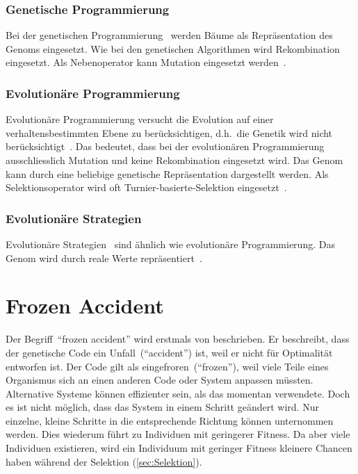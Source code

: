       \subsubsection{Genetische Programmierung\label{item:genProg}}

        Bei der genetischen Programmierung~\cite{book:genProg} werden Bäume als Repräsentation des Genoms eingesetzt.
        Wie bei den genetischen Algorithmen wird Rekombination eingesetzt.
        Als Nebenoperator kann Mutation eingesetzt werden~\cite[S.147]{book:evAlgo}.

      \subsubsection{Evolutionäre Programmierung\label{item:evProg}}

        Evolutionäre Programmierung versucht die Evolution auf einer verhaltensbestimmten Ebene zu berücksichtigen,
        d.h.\ die Genetik wird nicht berücksichtigt~\cite[S.140]{book:evAlgo}.
        Das bedeutet, dass bei der evolutionären Programmierung~\cite{book:artIntSimEv}
        ausschliesslich Mutation und keine Rekombination eingesetzt wird.
        Das Genom kann durch eine beliebige genetische Repräsentation dargestellt werden.
        Als Selektionsoperator wird oft Turnier-basierte-Selektion eingesetzt~\cite[S.33]{book:bioInspired}.

      \subsubsection{Evolutionäre Strategien\label{item:evStrat}}

        Evolutionäre Strategien~\cite{book:evStrat} sind ähnlich wie evolutionäre Programmierung.
        Das Genom wird durch reale Werte repräsentiert~\cite[S.134]{book:evAlgo}.

  \section{Frozen Accident}

    Der Begriff~``frozen accident'' wird erstmals von \citet{Crick1968} beschrieben.
    Er beschreibt, dass der genetische Code ein Unfall~(``accident'') ist,
    weil er nicht für Optimalität entworfen ist.
    Der Code gilt als eingefroren~(``frozen''),
    weil viele Teile eines Organismus sich an einen anderen Code oder System anpassen müssten.
    Alternative Systeme können effizienter sein, als das momentan verwendete.
    Doch es ist nicht möglich, dass das System in einem Schritt geändert wird.
    Nur einzelne, kleine Schritte in die entsprechende Richtung können unternommen werden.
    Dies wiederum führt zu Individuen mit geringerer Fitness.
    Da aber viele Individuen existieren,
    wird ein Individuum mit geringer Fitness kleinere Chancen haben während der Selektion (\vref{sec:Selektion}).
